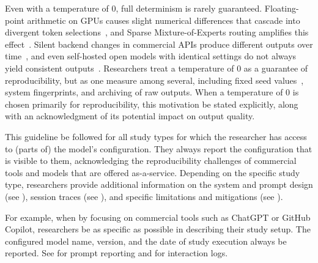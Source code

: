 Even with a temperature of 0, full determinism is rarely guaranteed. Floating-point arithmetic on GPUs causes slight numerical differences that cascade into divergent token selections~\cite{YuanNondeterminismLLMInference}, and Sparse Mixture-of-Experts routing amplifies this effect~\cite{Chann2023}. Silent backend changes in commercial APIs produce different outputs over time~\cite{DBLP:journals/corr/abs-2307-09009}, and even self-hosted open models with identical settings do not always yield consistent outputs~\cite{DBLP:journals/corr/abs-2408-04667}.
Researchers \shouldnot treat a temperature of 0 as a guarantee of reproducibility, but as one measure among several, including fixed seed values~\cite{OpenAI23}, system fingerprints, and archiving of raw outputs.
When a temperature of 0 is chosen primarily for reproducibility, this motivation \should be stated explicitly, along with an acknowledgment of its potential impact on output quality.


This guideline \must be followed for all study types for which the researcher has access to (parts of) the model's configuration.
They \must always report the configuration that is visible to them, acknowledging the reproducibility challenges of commercial tools and models that are offered as-a-service.
Depending on the specific study type, researchers \should provide additional information on the system and prompt design (see \design), session traces (see \traces), and specific limitations and mitigations (see \limitationsmitigations).

For example, when \llmusage by focusing on commercial tools such as ChatGPT or GitHub Copilot, researchers \must be as specific as possible in describing their study setup.
The configured model name, version, and the date of study execution \must always be reported.
See \design for prompt reporting and \traces for interaction logs.

